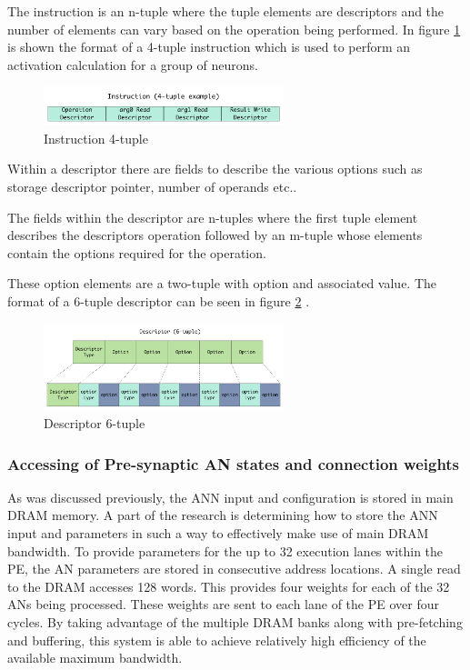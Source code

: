 \documentclass[journal]{IEEEtran}
\begin{document}
The instruction is an n-tuple where the tuple elements are descriptors and the number of elements can vary based on the operation being performed. In figure \ref{fig:instructionTuple} is shown the format of a 4-tuple instruction which is used to perform an activation calculation for a group of neurons.

\begin{figure}[!t]
\centerline{
\mbox{\includegraphics[width=2.75in]{instructionTuple.jpg}}
}
\caption{Instruction 4-tuple}
\label{fig:instructionTuple}
\end{figure}

Within a descriptor there are fields to describe the various options such as storage descriptor pointer, number of operands etc..

The fields within the descriptor are n-tuples where the first tuple element describes the descriptors operation followed by an m-tuple whose elements contain the options required for the operation.

These option elements are a two-tuple with option and associated value.
The format of a 6-tuple descriptor can be seen in figure \ref{fig:descriptorTuple} .

\begin{figure}[!t]
\centerline{
\mbox{\includegraphics[width=2.75in]{descriptorTuple.jpg}}
}
\caption{Descriptor 6-tuple}
\label{fig:descriptorTuple}
\end{figure}



\subsubsection{Accessing of Pre-synaptic AN states and connection weights}
\label{ssec:AccessingANStates}

As was discussed previously, the ANN input and configuration is stored in main DRAM memory. A part of the research is determining how to store the ANN input and parameters in such a way to effectively make use of main DRAM bandwidth. To provide parameters for the up to 32 execution lanes within the PE, the AN parameters are stored in consecutive address locations. A single read to the DRAM accesses 128 words. This provides four weights for each of the 32 ANs being processed. 
These weights are sent to each lane of the PE over four cycles. 
By taking advantage of the multiple DRAM banks along with pre-fetching and buffering, this system is able to achieve relatively high efficiency of the available maximum bandwidth.
\end{document}
